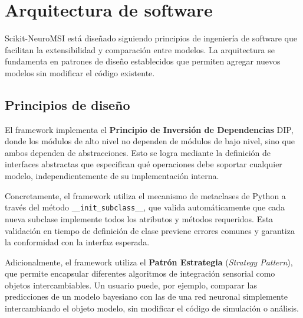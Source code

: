 
\section{Arquitectura de software}
\label{sec:snmsi_arquitectura}

Scikit-NeuroMSI está diseñado siguiendo principios de ingeniería de software que facilitan la extensibilidad y comparación entre modelos. La arquitectura se fundamenta en patrones de diseño establecidos que permiten agregar nuevos modelos sin modificar el código existente.

\subsection{Principios de diseño}
\label{subsec:snmsi_principios}

El framework implementa el \textbf{Principio de Inversión de Dependencias} \acrfull{DIP}, donde los módulos de alto nivel no dependen de módulos de bajo nivel, sino que ambos dependen de abstracciones. Esto se logra mediante la definición de interfaces abstractas que especifican qué operaciones debe soportar cualquier modelo, independientemente de su implementación interna. 

Concretamente, el framework utiliza el mecanismo de metaclases de Python a través del método \texttt{\_\_init\_subclass\_\_}, que valida automáticamente que cada nueva subclase implemente todos los atributos y métodos requeridos. Esta validación en tiempo de definición de clase previene errores comunes y garantiza la conformidad con la interfaz esperada.

Adicionalmente, el framework utiliza el \textbf{Patrón Estrategia} (\textit{Strategy Pattern}), que permite encapsular diferentes algoritmos de integración sensorial como objetos intercambiables. Un usuario puede, por ejemplo, comparar las predicciones de un modelo bayesiano con las de una red neuronal simplemente intercambiando el objeto modelo, sin modificar el código de simulación o análisis.

